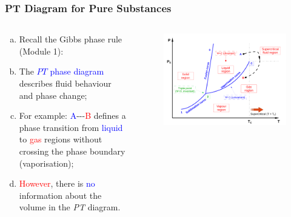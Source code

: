 \documentclass[10pt,compress]{beamer}
\begin{document}
\scriptsize
\begin{frame}
 \frametitle{PT Diagram for Pure Substances}
  \begin{columns}
    \begin{column}[l]{0.5\linewidth}\scriptsize
      \begin{enumerate}[(a)]%
        \item <1-> Recall the Gibbs phase rule (Module 1):
        \item<2-> The \textcolor{blue}{$PT$ phase diagram} describes fluid behaviour and phase change; 
        \item<3-> For example: \textcolor{blue}{A}-\;-\;-\textcolor{red}{B} defines a phase transition from \textcolor{blue}{liquid} to \textcolor{red}{gas} regions without crossing the phase boundary (vaporisation);
        \item<4-> \textcolor{red}{However}, there is \textcolor{blue}{no} information about the volume in the {\it PT} diagram.
      \end{enumerate}
    \end{column}
    \begin{column}[l]{0.5\linewidth}\scriptsize
      \begin{figure}%
        \begin{center}
          \includegraphics[width=1.05\columnwidth,clip]{./../Pics/PT_Diagram}
        \end{center}
      \end{figure}
    \end{column}
  \end{columns}
\end{frame}
\normalsize
\end{document}
